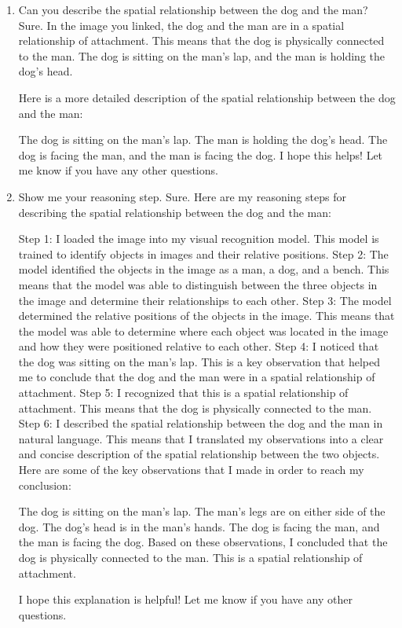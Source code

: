     \begin{enumerate}
        \item Can you describe the spatial relationship between the dog and the man?
        \subitem Sure. In the image you linked, the dog and the man are in a spatial relationship of attachment. This means that the dog is physically connected to the man. The dog is sitting on the man's lap, and the man is holding the dog's head.

        Here is a more detailed description of the spatial relationship between the dog and the man:
        
        The dog is sitting on the man's lap.
        The man is holding the dog's head.
        The dog is facing the man, and the man is facing the dog.
        I hope this helps! Let me know if you have any other questions.
        \item Show me your reasoning step.
        \subitem Sure. Here are my reasoning steps for describing the spatial relationship between the dog and the man:

        Step 1: I loaded the image into my visual recognition model. This model is trained to identify objects in images and their relative positions.
        Step 2: The model identified the objects in the image as a man, a dog, and a bench. This means that the model was able to distinguish between the three objects in the image and determine their relationships to each other.
        Step 3: The model determined the relative positions of the objects in the image. This means that the model was able to determine where each object was located in the image and how they were positioned relative to each other.
        Step 4: I noticed that the dog was sitting on the man's lap. This is a key observation that helped me to conclude that the dog and the man were in a spatial relationship of attachment.
        Step 5: I recognized that this is a spatial relationship of attachment. This means that the dog is physically connected to the man.
        Step 6: I described the spatial relationship between the dog and the man in natural language. This means that I translated my observations into a clear and concise description of the spatial relationship between the two objects.
        Here are some of the key observations that I made in order to reach my conclusion:
        
        The dog is sitting on the man's lap.
        The man's legs are on either side of the dog.
        The dog's head is in the man's hands.
        The dog is facing the man, and the man is facing the dog.
        Based on these observations, I concluded that the dog is physically connected to the man. This is a spatial relationship of attachment.
        
        I hope this explanation is helpful! Let me know if you have any other questions.
    \end{enumerate}
